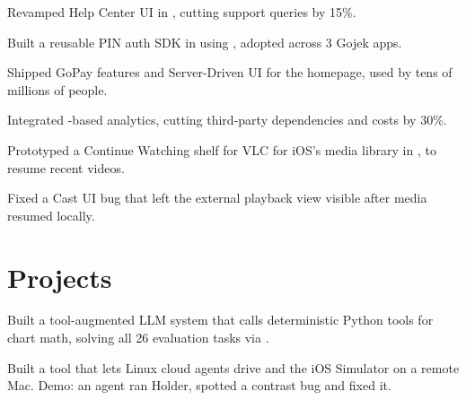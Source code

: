 \documentclass{fonts}
\begin{document}
\textbf{\href{https://www.gojek.io/}{}}
\begin{tightemize}
\item Revamped Help Center UI in , cutting support queries by 15\%.
\item Built a reusable PIN auth SDK in  using , adopted across 3 Gojek apps.
\item Shipped GoPay  features and Server-Driven UI for the homepage, used by tens of millions of people.
\item Integrated -based analytics, cutting third-party dependencies and costs by 30\%.
\end{tightemize}

\textbf{\href{https://summerofcode.withgoogle.com/archive/2021/projects/5007392080658432}{}}
\begin{tightemize}
  \item Prototyped a Continue Watching shelf for VLC for iOS's media library in , to resume recent videos.
  \item Fixed a Cast UI bug that left the external playback view visible after media resumed locally.
\end{tightemize}


\section{Projects}

\textbf{}
\begin{tightemize}
    \item Built a tool-augmented LLM system that calls deterministic Python tools for chart math, solving all 26 evaluation tasks via .
\end{tightemize}

\textbf{\href{https://www.linkedin.com/feed/update/urn:li:activity:7508661721595691008/}{}}
\begin{tightemize}
    \item Built a tool that lets Linux cloud agents drive  and the iOS Simulator on a remote Mac. Demo: an agent ran Holder, spotted a contrast bug and fixed it.
\end{tightemize}
\end{document}
